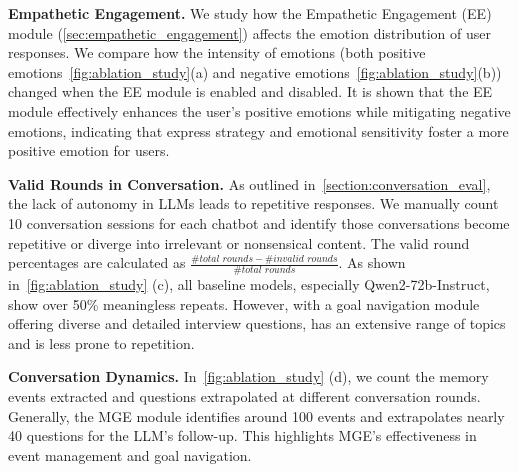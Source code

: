 \noindent\textbf{Empathetic Engagement.} We study how the Empathetic Engagement (EE) module (\cref{sec:empathetic_engagement}) affects the emotion distribution of user responses. We compare how the intensity of emotions (both positive emotions~\cref{fig:ablation_study}(a) and negative emotions~\cref{fig:ablation_study}(b)) changed when the EE module is enabled and disabled. It is shown that the EE module effectively enhances the user's positive emotions while mitigating negative emotions, indicating that express strategy and emotional sensitivity foster a more positive emotion for users.



\noindent\textbf{Valid Rounds in Conversation.} As outlined in~\cref{section:conversation_eval}, the lack of autonomy in LLMs leads to repetitive responses. We manually count 10 conversation sessions for each chatbot and identify those conversations become repetitive or diverge into irrelevant or nonsensical content. The valid round percentages are calculated as $\frac{\#total\,\,rounds - \#invalid\,\,rounds}{\#total\,\,rounds}$. As shown in~\cref{fig:ablation_study} (c), all baseline models, especially Qwen2-72b-Instruct, show over 50\% meaningless repeats. However, \methodname with a goal navigation module offering diverse and detailed interview questions, has an extensive range of topics and is less prone to repetition.

\noindent\textbf{Conversation Dynamics.} In~\cref{fig:ablation_study} (d), we count the memory events extracted and questions extrapolated at different conversation rounds. Generally, the MGE module identifies around 100 events and extrapolates nearly 40 questions for the LLM's follow-up. This highlights MGE's effectiveness in event management and goal navigation.

